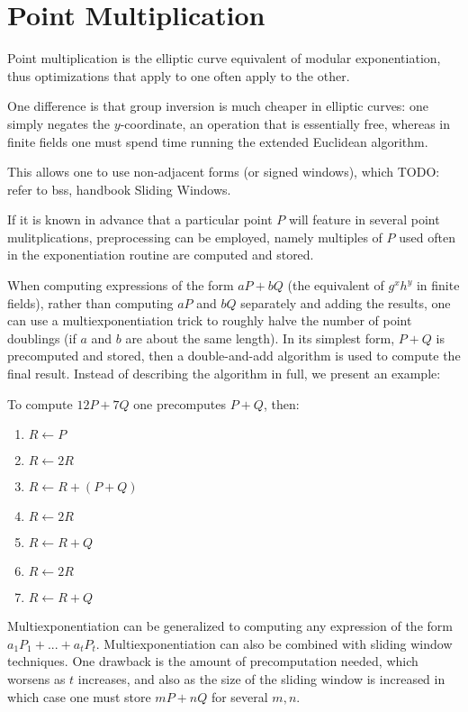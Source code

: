 \section {Point Multiplication}

Point multiplication is the elliptic curve equivalent of modular
exponentiation, thus optimizations that apply to one often apply to the other.

One difference is that group inversion is much cheaper in elliptic curves:
one simply negates the $y$-coordinate, an operation that is essentially free,
whereas in finite fields one must spend time running the extended
Euclidean algorithm.

This allows one to use non-adjacent forms (or signed windows), which
TODO: refer to bss, handbook
Sliding Windows.

If it is known in advance that a particular point $P$ will feature in
several point mulitplications, preprocessing can be employed, namely
multiples of $P$ used often in the exponentiation routine
are computed and stored.

When computing expressions
of the form $a P + b Q$ (the equivalent of $g^x h^y$ in
finite fields), rather than computing $a P$ and $b Q$ separately
and adding the results, one can use
a multiexponentiation trick to roughly halve the number of point doublings
(if $a$ and $b$ are about the same length).
In its simplest form, $P + Q$ is precomputed and stored,
then a double-and-add algorithm is used to compute the
final result. Instead of describing the algorithm in full, we present
an example:

To compute $12 P + 7 Q$ one precomputes $P + Q$, then:

\begin{enumerate}
\item
$R \leftarrow P$
\item
$R \leftarrow 2R$
\item
$R \leftarrow R + (P + Q)$
\item
$R \leftarrow 2R$
\item
$R \leftarrow R + Q$
\item
$R \leftarrow 2R$
\item
$R \leftarrow R + Q$
\end{enumerate}

Multiexponentiation can
be generalized to computing any expression of the form
$a_1 P_1 + ... + a_t P_t$. Multiexponentiation can also be combined with
sliding window techniques.
One drawback is the amount of precomputation needed,
which worsens as $t$ increases, and also as the size of the sliding window
is increased in which case one must store $m P + n Q$ for several $m, n$.

